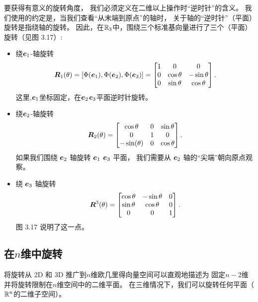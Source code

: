 要获得有意义的旋转角度，
我们必须定义在二维以上操作时“逆时针”的含义。
我们使用的约定是，当我们查看“从末端到原点”的轴时，
关于轴的“逆时针”（平面）旋转是指绕轴的旋转。
因此，在$\mathbb{R}_3$中，围绕三个标准基向量进行了三个（平面）旋转（见图 3.17）:
\begin{itemize}
    \item 绕$\boldsymbol{e}_1$-轴旋转
    \begin{equation}
         \boldsymbol{R}_1(\theta) =
         [\Phi(\boldsymbol{e}_1), \Phi(\boldsymbol{e}_2),\Phi(\boldsymbol{e}_3)] =
         \begin{bmatrix}
             1 & 0 & 0 \\
             0 & \cos \theta & -\sin \theta \\
             0 & \sin \theta & \cos \theta \\
         \end{bmatrix}.
    \end{equation}
    这里,$\boldsymbol{e}_1$坐标固定，在$\boldsymbol{e}_2$$\boldsymbol{e}_3$平面逆时针旋转。
    \item 绕$\boldsymbol{e}_2$-轴旋转
    \begin{equation}
        \boldsymbol{R}_2(\theta) =
        \begin{bmatrix}
            \cos \theta & 0 & \sin \theta \\
            0 & 1 & 0 \\
            -\sin(\theta) & 0 & \cos \theta
        \end{bmatrix}.
    \end{equation}
    如果我们围绕 $\boldsymbol{e}_2$ 轴旋转 $\boldsymbol{e}_1$ $\boldsymbol{e}_3$ 平面，
    我们需要从 $\boldsymbol{e}_2$ 轴的“尖端”朝向原点观察。
    \item 绕 $\boldsymbol{e}_3$ 轴旋转
    \begin{equation}
        \boldsymbol{R}^3(\theta) =
        \begin{bmatrix}
            \cos \theta & -\sin \theta & 0 \\
            \sin \theta & \cos \theta & 0 \\
            0 & 0 & 1
        \end{bmatrix}.
    \end{equation}
    图 3.17 说明了这一点。
\end{itemize}

\subsection{在$n$维中旋转}
将旋转从 2D 和 3D 推广到$n$维欧几里得向量空间可以直观地描述为
固定$n - 2$维并将旋转限制在$n$维空间中的二维平面。
在三维情况下，我们可以旋转任何平面（$\mathbb{R}^n$的二维子空间）。


